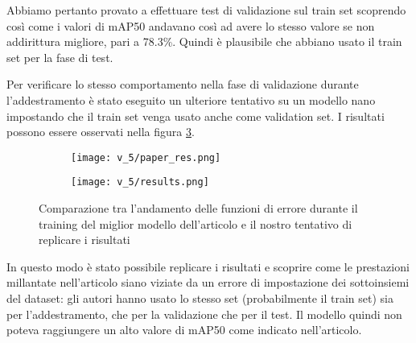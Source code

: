 Abbiamo pertanto provato a effettuare test di validazione sul train set scoprendo così
come i valori di mAP50 andavano così ad avere lo stesso valore se non addirittura
migliore, pari a 78.3\%. Quindi è plausibile che abbiano usato il train set per la fase di test.

Per verificare lo stesso comportamento nella fase di validazione durante l'addestramento
è stato eseguito un ulteriore tentativo su un modello nano impostando che il train set venga usato
anche come validation set. I risultati possono essere osservati nella figura \ref{fig:v5-4}.

    \begin{figure}[!htb]
        \centering
        \begin{subfigure}{.8\textwidth}
            \texttt{[image: v\_5/paper\_res.png]}
            \label{fig:v5-4.1}
        \end{subfigure}
        \begin{subfigure}{.8\textwidth}
            \texttt{[image: v\_5/results.png]}
            \label{fig:v5-4.2}
        \end{subfigure}
        \caption{Comparazione tra l'andamento delle funzioni di errore durante il training
        del miglior modello dell'articolo e il nostro tentativo di replicare i risultati}
        \label{fig:v5-4}
    \end{figure}

In questo modo è stato possibile replicare i risultati e scoprire come le prestazioni
millantate nell'articolo siano viziate da un errore di impostazione dei sottoinsiemi
del dataset: gli autori hanno usato lo stesso set (probabilmente il train set)
sia per l'addestramento, che per la validazione che per il test. 
Il modello quindi non poteva raggiungere un alto valore di mAP50 
come indicato nell'articolo.
